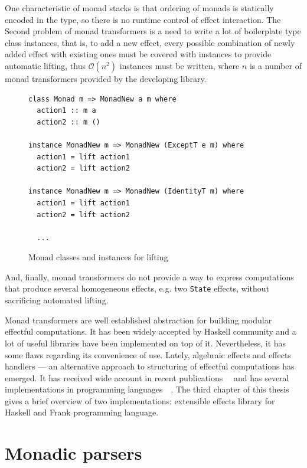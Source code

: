       One characteristic of monad stacks is that ordering of monads is statically encoded
      in the type, so there is no runtime control of effect interaction.
      The Second problem of monad transformers is a need to write a lot of boilerplate
      type class instances, that is, to add a new effect, every possible combination
      of newly added effect with existing ones must be covered with instances to provide
      automatic lifting, thus $\mathcal{O}(n^2)$ instances must be written,
      where $n$ is a number of monad transformers provided by the developing library.

      \begin{figure}[h]
      \begin{lstlisting}
class Monad m => MonadNew a m where
  action1 :: m a
  action2 :: m ()

instance MonadNew m => MonadNew (ExceptT e m) where
  action1 = lift action1
  action2 = lift action2

instance MonadNew m => MonadNew (IdentityT m) where
  action1 = lift action1
  action2 = lift action2

  ...
      \end{lstlisting}
      \caption{Monad classes and instances for lifting}
      \label{listing:mtlLift}
      \end{figure}

      And, finally, monad transformers do not provide a way to express computations that
      produce several homogeneous effects, e.g. two \texttt{State} effects, without
      sacrificing automated lifting.

      Monad transformers are well established abstraction for building modular effectful
      computations. It has been widely accepted by Haskell community and a lot of
      useful libraries have been implemented on top of it. Nevertheless, it has some
      flaws regarding its convenience of use. Lately, algebraic effects and effects
      handlers --- an alternative approach to structuring of effectful computations
      has emerged. It has received wide account in recent
      publications~\cite{DBLP:journals/jlp/BauerP15}~\cite{Kiselyov:2013:EEA:2578854.2503791}
      and has several implementations in programming
      languages~\cite{Kiselyov:2013:EEA:2578854.2503791}~\cite{DBLP:conf/popl/LindleyMM17}.
      The third chapter of this thesis gives a brief overview of two
      implementations: extensible effects library for Haskell and Frank programming language.

  \section{Monadic parsers}
  \label{cpt-parsers:monadic}

